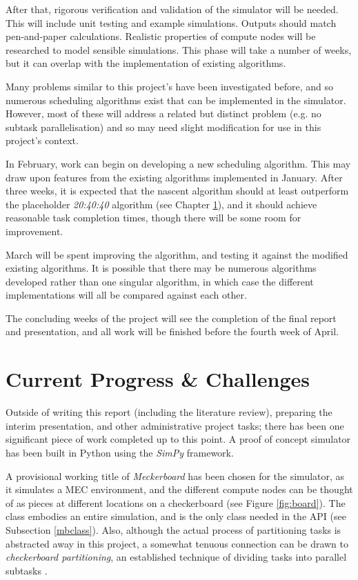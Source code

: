 \documentclass[]{UCD_CS_Interim_Report}
\begin{document}
After that, rigorous verification and validation of the simulator will be needed. This will include unit testing and example simulations. Outputs should match pen-and-paper calculations. Realistic properties of compute nodes will be researched to model sensible simulations. This phase will take a number of weeks, but it can overlap with the implementation of existing algorithms.

Many problems similar to this project's have been investigated before, and so numerous scheduling algorithms exist that can be implemented in the simulator. However, most of these will address a related but distinct problem (e.g. no subtask parallelisation) and so may need slight modification for use in this project's context.

In February, work can begin on developing a new scheduling algorithm. This may draw upon features from the existing algorithms implemented in January. After three weeks, it is expected that the nascent algorithm should at least outperform the placeholder \textit{20:40:40} algorithm (see Chapter \ref{progress}), and it should achieve reasonable task completion times, though there will be some room for improvement.

March will be spent improving the algorithm, and testing it against the modified existing algorithms. It is possible that there may be numerous algorithms developed rather than one singular algorithm, in which case the different implementations will all be compared against each other.

The concluding weeks of the project will see the completion of the final report and presentation, and all work will be finished before the fourth week of April.


% 
\chapter{Current Progress \& Challenges} \label{progress}
Outside of writing this report (including the literature review), preparing the interim presentation, and other administrative project tasks; there has been one significant piece of work completed up to this point. A proof of concept simulator has been built in Python using the \textit{SimPy} framework. 

A provisional working title of \textit{Meckerboard} has been chosen for the simulator, as it simulates a MEC environment, and the different compute nodes can be thought of as pieces at different locations on a checkerboard (see Figure \ref{fig:board}). The  class embodies an entire simulation, and is the only class needed in the API (see Subsection \ref{mbclass}). Also, although the actual process of partitioning tasks is abstracted away in this project, a somewhat tenuous connection can be drawn to \textit{checkerboard partitioning}, an established technique of dividing tasks into parallel subtasks \cite{bisseling2012partitioning}. 
\end{document}
